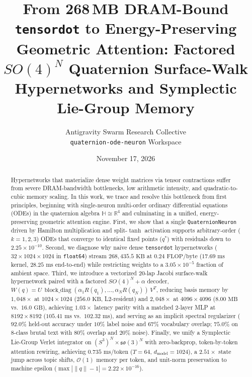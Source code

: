 \documentclass[11pt,twocolumn]{article}
\title{\textbf{From 268\,MB DRAM-Bound \texttt{tensordot} to Energy-Preserving Geometric Attention: Factored $SO(4)^N$ Quaternion Surface-Walk Hypernetworks and Symplectic Lie-Group Memory}}
\author{
Antigravity Swarm Research Collective \\
\texttt{quaternion-ode-neuron} Workspace
}
\date{November 17, 2026}
\begin{document}
\maketitle

\begin{abstract}
Hypernetworks that materialize dense weight matrices via tensor contractions suffer from severe DRAM-bandwidth bottlenecks, low arithmetic intensity, and quadratic-to-cubic memory scaling. In this work, we trace and resolve this bottleneck from first principles, beginning with single-neuron multi-order ordinary differential equations (ODEs) in the quaternion algebra $\mathbb{H} \cong \mathbb{R}^4$ and culminating in a unified, energy-preserving geometric attention engine. First, we show that a single \texttt{QuaternionNeuron} driven by Hamilton multiplication and split-$\tanh$ activation supports arbitrary-order ($k=1,2,3$) ODEs that converge to identical fixed points ($q^*$) with residuals down to $2.25 \times 10^{-10}$. Second, we diagnose why naive dense \texttt{tensordot} hypernetworks ($32 \times 1024 \times 1024$ in \texttt{float64}) stream $268{,}435.5\text{ KB}$ at $0.24\text{ FLOP/byte}$ ($17.69\text{ ms}$ kernel, $28.25\text{ ms}$ end-to-end) while restricting weights to a $3.05 \times 10^{-5}$ fraction of ambient space. Third, we introduce a vectorized 20-lap Jacobi surface-walk hypernetwork paired with a factored $SO(4)^N + \alpha$ decoder, $W(q) = U\,\operatorname{block\_diag}(\alpha_1 R(q_1), \dots, \alpha_N R(q_N))\,V^T$, reducing basis memory by $1{,}048\times$ at $1024 \times 1024$ ($256.0\text{ KB}$, L2-resident) and $2{,}048\times$ at $4096 \times 4096$ ($8.00\text{ MB}$ vs.\ $16.0\text{ GB}$), achieving $1.03\times$ latency parity with a matched 2-layer MLP at $8192 \times 8192$ ($105.41\text{ ms}$ vs.\ $102.32\text{ ms}$), and serving as an implicit spectral regularizer ($92.0\%$ held-out accuracy under $10\%$ label noise and $67\%$ vocabulary overlap; $75.0\%$ on 8-class brutal text with $80\%$ overlap and $20\%$ noise). Finally, we unify a Symplectic Lie-Group Verlet integrator on $(S^3)^N \times \mathfrak{so}(3)^N$ with zero-backprop, token-by-token attention rewiring, achieving $0.735\text{ ms/token}$ ($T=64$, $d_{\text{model}}=1024$), a $2.51\times$ state jump across topic shifts, $\mathcal{O}(1)$ memory per token, and unit-norm preservation to machine epsilon ($\max |\|q\| - 1| = 2.22 \times 10^{-16}$).
\end{abstract}
\end{document}
